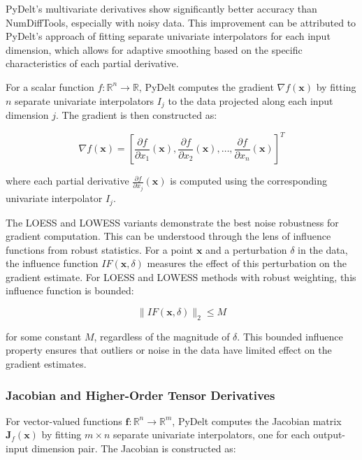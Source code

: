 \documentclass[10pt,journal,compsoc]{IEEEtran}
\begin{document}
PyDelt's multivariate derivatives show significantly better accuracy than NumDiffTools, especially with noisy data. This improvement can be attributed to PyDelt's approach of fitting separate univariate interpolators for each input dimension, which allows for adaptive smoothing based on the specific characteristics of each partial derivative.

For a scalar function $f: \mathbb{R}^n \rightarrow \mathbb{R}$, PyDelt computes the gradient $\nabla f(\mathbf{x})$ by fitting $n$ separate univariate interpolators $I_j$ to the data projected along each input dimension $j$. The gradient is then constructed as:

\begin{equation}
    \nabla f(\mathbf{x}) = \left[ \frac{\partial f}{\partial x_1}(\mathbf{x}), \frac{\partial f}{\partial x_2}(\mathbf{x}), \ldots, \frac{\partial f}{\partial x_n}(\mathbf{x}) \right]^T
\end{equation}

where each partial derivative $\frac{\partial f}{\partial x_j}(\mathbf{x})$ is computed using the corresponding univariate interpolator $I_j$.

The LOESS and LOWESS variants demonstrate the best noise robustness for gradient computation. This can be understood through the lens of influence functions from robust statistics. For a point $\mathbf{x}$ and a perturbation $\delta$ in the data, the influence function $IF(\mathbf{x}, \delta)$ measures the effect of this perturbation on the gradient estimate. For LOESS and LOWESS methods with robust weighting, this influence function is bounded:

\begin{equation}
    \|IF(\mathbf{x}, \delta)\|_2 \leq M
\end{equation}

for some constant $M$, regardless of the magnitude of $\delta$. This bounded influence property ensures that outliers or noise in the data have limited effect on the gradient estimates.

\subsubsection{Jacobian and Higher-Order Tensor Derivatives}

For vector-valued functions $\mathbf{f}: \mathbb{R}^n \rightarrow \mathbb{R}^m$, PyDelt computes the Jacobian matrix $\mathbf{J}_f(\mathbf{x})$ by fitting $m \times n$ separate univariate interpolators, one for each output-input dimension pair. The Jacobian is constructed as:
\end{document}
